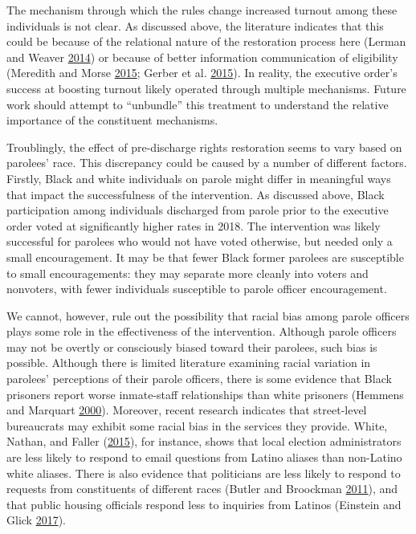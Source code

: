 \documentclass[
  12pt,
]{article}
\begin{document}
The mechanism through which the rules change increased turnout among these individuals is not clear. As discussed above, the literature indicates that this could be because of the relational nature of the restoration process here (Lerman and Weaver \protect\hyperlink{ref-Lerman2014}{2014}) or because of better information communication of eligibility (Meredith and Morse \protect\hyperlink{ref-Meredith2015}{2015}; Gerber et al. \protect\hyperlink{ref-Gerber2015}{2015}). In reality, the executive order's success at boosting turnout likely operated through multiple mechanisms. Future work should attempt to ``unbundle'' this treatment to understand the relative importance of the constituent mechanisms.

Troublingly, the effect of pre-discharge rights restoration seems to vary based on parolees' race. This discrepancy could be caused by a number of different factors. Firstly, Black and white individuals on parole might differ in meaningful ways that impact the successfulness of the intervention. As discussed above, Black participation among individuals discharged from parole prior to the executive order voted at significantly higher rates in 2018. The intervention was likely successful for parolees who would not have voted otherwise, but needed only a small encouragement. It may be that fewer Black former parolees are susceptible to small encouragements: they may separate more cleanly into voters and nonvoters, with fewer individuals susceptible to parole officer encouragement.

We cannot, however, rule out the possibility that racial bias among parole officers plays some role in the effectiveness of the intervention. Although parole officers may not be overtly or consciously biased toward their parolees, such bias is possible. Although there is limited literature examining racial variation in parolees' perceptions of their parole officers, there is some evidence that Black prisoners report worse inmate-staff relationships than white prisoners (Hemmens and Marquart \protect\hyperlink{ref-Hemmens2000}{2000}). Moreover, recent research indicates that street-level bureaucrats may exhibit some racial bias in the services they provide. White, Nathan, and Faller (\protect\hyperlink{ref-White2015}{2015}), for instance, shows that local election administrators are less likely to respond to email questions from Latino aliases than non-Latino white aliases. There is also evidence that politicians are less likely to respond to requests from constituents of different races (Butler and Broockman \protect\hyperlink{ref-Butler2011}{2011}), and that public housing officials respond less to inquiries from Latinos (Einstein and Glick \protect\hyperlink{ref-Einstein2017}{2017}).
\end{document}
